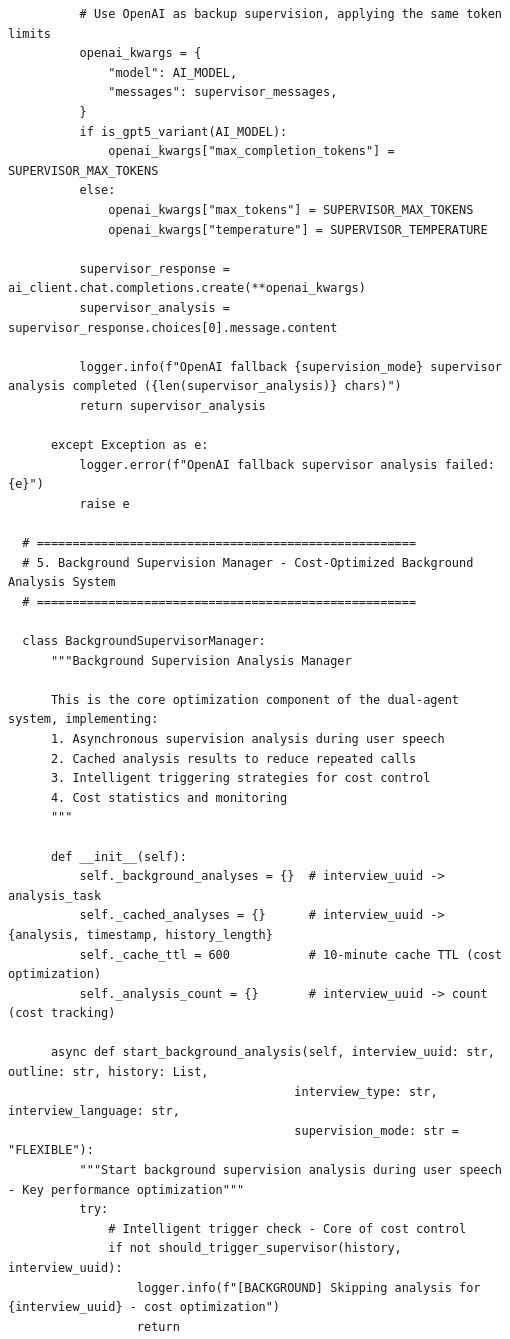\documentclass[sigchi,nonacm,manuscript]{acmart}
\begin{document}
\begin{lstlisting}
          # Use OpenAI as backup supervision, applying the same token limits
          openai_kwargs = {
              "model": AI_MODEL,
              "messages": supervisor_messages,
          }
          if is_gpt5_variant(AI_MODEL):
              openai_kwargs["max_completion_tokens"] = SUPERVISOR_MAX_TOKENS
          else:
              openai_kwargs["max_tokens"] = SUPERVISOR_MAX_TOKENS
              openai_kwargs["temperature"] = SUPERVISOR_TEMPERATURE
          
          supervisor_response = ai_client.chat.completions.create(**openai_kwargs)
          supervisor_analysis = supervisor_response.choices[0].message.content
          
          logger.info(f"OpenAI fallback {supervision_mode} supervisor analysis completed ({len(supervisor_analysis)} chars)")
          return supervisor_analysis

      except Exception as e:
          logger.error(f"OpenAI fallback supervisor analysis failed: {e}")
          raise e

  # =====================================================
  # 5. Background Supervision Manager - Cost-Optimized Background Analysis System
  # =====================================================

  class BackgroundSupervisorManager:
      """Background Supervision Analysis Manager
      
      This is the core optimization component of the dual-agent system, implementing:
      1. Asynchronous supervision analysis during user speech
      2. Cached analysis results to reduce repeated calls
      3. Intelligent triggering strategies for cost control
      4. Cost statistics and monitoring
      """
      
      def __init__(self):
          self._background_analyses = {}  # interview_uuid -> analysis_task
          self._cached_analyses = {}      # interview_uuid -> {analysis, timestamp, history_length}
          self._cache_ttl = 600           # 10-minute cache TTL (cost optimization)
          self._analysis_count = {}       # interview_uuid -> count (cost tracking)
      
      async def start_background_analysis(self, interview_uuid: str, outline: str, history: List, 
                                        interview_type: str, interview_language: str, 
                                        supervision_mode: str = "FLEXIBLE"):
          """Start background supervision analysis during user speech - Key performance optimization"""
          try:
              # Intelligent trigger check - Core of cost control
              if not should_trigger_supervisor(history, interview_uuid):
                  logger.info(f"[BACKGROUND] Skipping analysis for {interview_uuid} - cost optimization")
                  return
              

\end{lstlisting}
\end{document}
